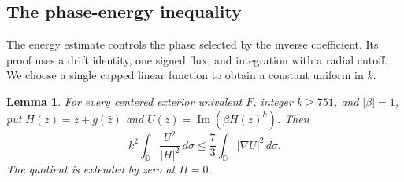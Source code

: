 \documentclass[11pt]{article}
\newtheorem{lemma}[theorem]{Lemma}
\newcommand{\D}{\mathbb D}
\begin{document}
	\subsection{The phase-energy inequality}\label{sec:energy-cert}
	The energy estimate controls the phase selected by the inverse
	coefficient.  Its proof uses a drift identity, one signed flux, and
	integration with a radial cutoff. We choose a single capped linear
	function to obtain a constant uniform in $k$.
	
	\begin{lemma}\label{lem:actual-phase-energy}
		For every centered exterior univalent $F$, integer $k\geq751$, and
		$|\beta|=1$, put $H(z)=z+g(\bar z)$ and
		$U(z)=\operatorname{Im}(\beta H(z)^k)$.  Then
		\[
		k^2\int_\D \frac{U^2}{|H|^2}\,d\sigma
		\leq\frac73\int_\D |\nabla U|^2\,d\sigma.
		\]
		The quotient is extended by zero at $H=0$.
	\end{lemma}
\end{document}
